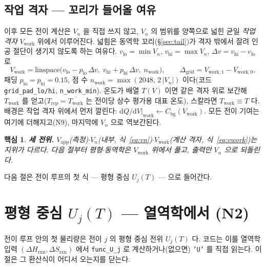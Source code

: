 \documentclass[11pt,a4paper]{article}
\newtheorem*{keybox}{핵심}
\newcommand{\dd}{\mathrm{d}}
\newcommand{\app}{\mathrm{app}}
\newcommand{\bg}{\mathrm{bg}}
\newcommand{\rxn}{\mathrm{rxn}}
\newcommand{\work}{\mathrm{work}}
\newcommand{\code}[1]{\texttt{#1}}
\begin{document}
\subsection{작업 격자 — 꼬리가 들어올 여유}
이후 모든 전이 계산은 $V_n$ 을 직접 쓰지 않고, $V_n$ 의 범위를 양쪽으로 넓힌 균일 \emph{작업 격자} $V_\work$ 위에서
이루어진다. 넓힘은 동역학 꼬리(\S\ref{sec:tail})가 격자 밖에서 잘려 인공 절단이 생기지 않도록 하는 여유다.
$v_\mathrm{lo}=\min V_n$, $v_\mathrm{hi}=\max V_n$, $\Delta v=v_\mathrm{hi}-v_\mathrm{lo}$ 로
\begin{equation}
V_\work=\mathrm{linspace}\big(v_\mathrm{lo}-p_\mathrm{lo}\,\Delta v,\;
v_\mathrm{hi}+p_\mathrm{hi}\,\Delta v,\;n_\work\big),
\qquad \Delta_\mathrm{grid}=V_{\work,1}-V_{\work,0},
\label{eq:vwork}
\end{equation}
패딩 $p_\mathrm{lo}=p_\mathrm{hi}=0.15$, 점 수 $n_\work=\max(2048,\,2\,|V_n|)$ 이다(코드 \code{grid\_pad\_lo/hi},
\code{n\_work\_min}). 온도가 배열 $T(V)$ 이면 같은 격자 위로 보간해 $T_\work$ 를 얻고($T_\mathrm{rep}=\overline{T_\work}$ 는
전이당 상수 평가용 대표 온도), 스칼라면 $T_\work\equiv T$ 다. 배경은 작업 격자 위에서 먼저 깔린다:
$\dd Q/\dd V|_\work \leftarrow C_\bg(V_\work)$. 모든 전이 기여는 여기에 더해지고($\mathrm N9$), 마지막에 $V_n$ 으로
역보간된다.

\begin{keybox}
\textbf{세 전위.} $V_\app$(측정)$\cdot$$V_n$(내부, 식~\eqref{eq:vn})$\cdot$$V_\work$(계산 격자, 식~\eqref{eq:vwork})는
지위가 다르다. 다음 절부터 평형$\cdot$동역학은 $V_\work$ 위에서 풀고, 출력만 $V_n$ 으로 되돌린다.
\end{keybox}

다음 절은 전이 루프의 첫 식 — 평형 중심 $U_j(T)$ — 으로 들어간다.

\section{평형 중심 $U_j(T)$ — 열역학에서 (N2)}\label{sec:center}
전이 루프 안의 첫 물리량은 전이 $j$ 의 평형 중심 전위 $U_j(T)$ 다. 코드는 이를 열역학 입력 $(\Delta H_\rxn,\Delta S_\rxn)$
에서 \code{func\_U\_j} 로 계산하거나(없으면) \code{'U'} 를 직접 읽는다. 이 절은 그 환산식이 어디서 오는지를 닫는다.
\end{document}
